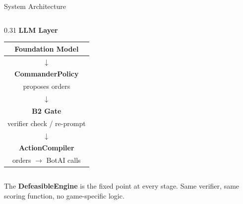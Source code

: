 \documentclass[aspectratio=169, 10pt]{beamer}
\begin{document}
\begin{frame}{System Architecture}
\begin{columns}[T]
    \begin{column}{0.31\textwidth}
      \centering\textbf{LLM Layer}\\[0.4em]
      \small
      \begin{tabular}{|c|}
        \hline
        Foundation Model \\ \hline
        $\downarrow$ \\
        \textbf{CommanderPolicy}\\
        proposes orders \\ \hline
        $\downarrow$ \\
        \textbf{B2 Gate}\\
        verifier check / re-prompt \\ \hline
        $\downarrow$ \\
        \textbf{ActionCompiler}\\
        orders $\to$ BotAI calls \\ \hline
      \end{tabular}
    \end{column}
  \end{columns}

  \vspace{0.4em}
  \centering\small
  The \textbf{DefeasibleEngine} is the fixed point at every stage.
  Same verifier, same scoring function, no game-specific logic.
\end{frame}
\end{document}
